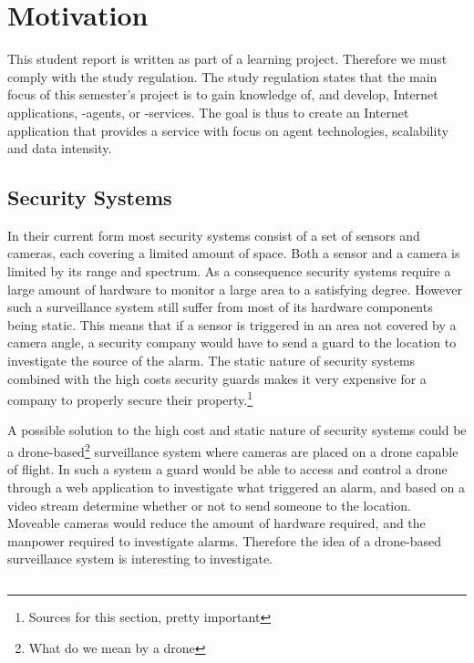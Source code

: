 \section{Motivation}
This student report is written as part of a learning project. Therefore we must comply with the study regulation.
The study regulation states that the main focus of this semester's project is to gain knowledge of, and develop, Internet applications, -agents, or -services.
The goal is thus to create an Internet application that provides a service with focus on agent technologies, scalability and data intensity.

\subsection{Security Systems}
In their current form most security systems consist of a set of sensors and cameras, each covering a limited amount of space.
Both a sensor and a camera is limited by its range and spectrum.
As a consequence security systems require a large amount of hardware to monitor a large area to a satisfying degree.
However such a surveillance system still suffer from most of its hardware components being static.
This means that if a sensor is triggered in an area not covered by a camera angle, a security company would have to send a guard to the location to investigate the source of the alarm.
The static nature of security systems combined with the high costs security guards makes it very expensive for a company to properly secure their property.\footnote{Sources for this section, pretty important}

A possible solution to the high cost and static nature of security systems could be a drone-based\footnote{What do we mean by a drone} surveillance system where cameras are placed on a drone capable of flight.
In such a system a guard would be able to access and control a drone through a web application to investigate what triggered an alarm, and based on a video stream determine whether or not to send someone to the location.
Moveable cameras would reduce the amount of hardware required, and the manpower required to investigate alarms.
Therefore the idea of a drone-based surveillance system is interesting to investigate.

\subsection{}




